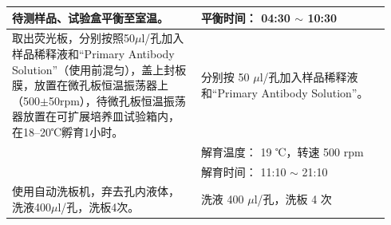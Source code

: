 \documentclass[UTF8,10pt,a4paper,fontset=fandol]{ctexart}
\newcommand{\fieldvalue}[1]{#1}
\newcommand{\handwritten}[1]{#1}
\begin{document}
\begin{tabular}{|p{0.47\linewidth}|p{0.47\linewidth}|}
\hline
待测样品、试验盒平衡至室温。 &
平衡时间：
\fieldvalue{\handwritten{04:30}} $\sim$
\fieldvalue{\handwritten{10:30}} \\ \hline

取出荧光板，分别按照50$\mu$l/孔加入样品稀释液和“Primary Antibody Solution”（使用前混匀），盖上封板膜，放置在微孔板恒温振荡器上（500$\pm$50rpm），待微孔板恒温振荡器放置在可扩展培养皿试验箱内，在18--20℃孵育1小时。 &
分别按
\fieldvalue{\handwritten{50}} $\mu$l/孔加入样品稀释液和“Primary Antibody Solution”。\\
&
解育温度：
\fieldvalue{\handwritten{19}} ℃，转速
\fieldvalue{\handwritten{500}} rpm\\
&
解育时间：
\fieldvalue{\handwritten{11:10}} $\sim$
\fieldvalue{\handwritten{21:10}} \\
\hline

使用自动洗板机，弃去孔内液体，洗液400$\mu$l/孔，洗板4次。 &
洗液
\fieldvalue{\handwritten{400}} $\mu$l/孔，洗板
\fieldvalue{\handwritten{4}} 次\\
\hline


\end{tabular}
\end{document}

